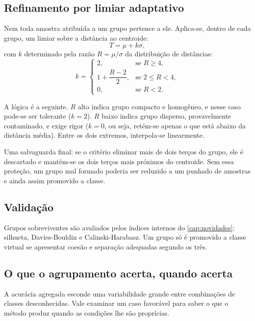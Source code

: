\subsection{Refinamento por limiar adaptativo}

Nem toda amostra atribuída a um grupo pertence a ele. Aplica-se, dentro de cada grupo,
um limiar sobre a distância ao centroide:
\[
  T = \mu + k\sigma,
\]
com $k$ determinado pela razão $R = \mu / \sigma$ da distribuição de distâncias:
\begin{equation}
  k = \begin{cases}
    2, & \text{se } R \geq 4, \\[0.2em]
    1 + \dfrac{R-2}{2}, & \text{se } 2 \leq R < 4, \\[0.5em]
    0, & \text{se } R < 2.
  \end{cases}
  \label{eq:aberto-kadaptativo}
\end{equation}

A lógica é a seguinte. $R$ alto indica grupo compacto e homogêneo, e nesse caso pode-se
ser tolerante ($k = 2$). $R$ baixo indica grupo disperso, provavelmente contaminado, e
exige rigor ($k = 0$, ou seja, retém-se apenas o que está abaixo da distância média).
Entre os dois extremos, interpola-se linearmente.

Uma salvaguarda final: se o critério eliminar mais de dois terços do grupo, ele é
descartado e mantêm-se os dois terços mais próximos do centroide. Sem essa proteção, um
grupo mal formado poderia ser reduzido a um punhado de amostras e ainda assim promovido
a classe.

\subsection{Validação}

Grupos sobreviventes são avaliados pelos índices internos do \cref{cap:novidades}:
silhueta, Davies-Bouldin e Calinski-Harabasz. Um grupo só é promovido a classe virtual
se apresentar coesão e separação adequadas segundo os três.

\subsection{O que o agrupamento acerta, quando acerta}

A acurácia agregada esconde uma variabilidade grande entre combinações de classes
desconhecidas. Vale examinar um caso favorável para saber o que o método produz quando
as condições lhe são proprícias.

